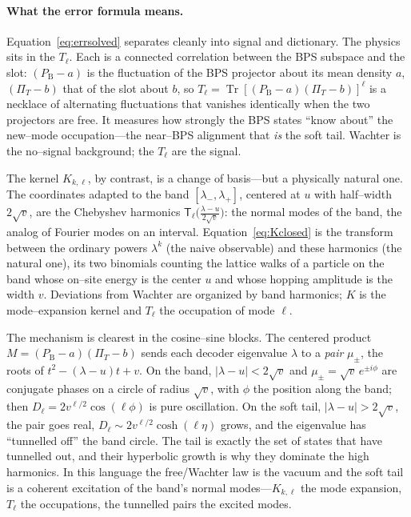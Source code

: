 \documentclass[11pt]{article}
\newcommand{\Tr}{\operatorname{Tr}}
\newcommand{\PB}{P_{\mathrm B}}
\newcommand{\PiT}{\Pi_T}
\begin{document}
\paragraph{What the error formula means.} Equation~\eqref{eq:errsolved} separates cleanly into signal
and dictionary. The physics sits in the $T_\ell$. Each is a connected correlation between the BPS
subspace and the slot: $(\PB-a)$ is the fluctuation of the BPS projector about its mean density $a$,
$(\PiT-b)$ that of the slot about $b$, so $T_\ell=\Tr[(\PB-a)(\PiT-b)]^\ell$ is a necklace of
alternating fluctuations that vanishes identically when the two projectors are free. It measures how
strongly the BPS states ``know about'' the new--mode occupation---the near--BPS alignment that
\emph{is} the soft tail. Wachter is the no--signal background; the $T_\ell$ are the signal.

The kernel $K_{k,\ell}$, by contrast, is a change of basis---but a physically natural one. The
coordinates adapted to the band $[\lambda_-,\lambda_+]$, centered at $u$ with half--width $2\sqrt v$,
are the Chebyshev harmonics $\mathsf T_\ell\!\big(\tfrac{\lambda-u}{2\sqrt v}\big)$: the normal modes of
the band, the analog of Fourier modes on an interval. Equation~\eqref{eq:Kclosed} is the transform
between the ordinary powers $\lambda^k$ (the naive observable) and these harmonics (the natural one),
its two binomials counting the lattice walks of a particle on the band whose on--site energy is the
center $u$ and whose hopping amplitude is the width $v$. Deviations from Wachter are organized by band
harmonics; $K$ is the mode--expansion kernel and $T_\ell$ the occupation of mode $\ell$.

The mechanism is clearest in the cosine--sine blocks. The centered product $M=(\PB-a)(\PiT-b)$ sends
each decoder eigenvalue $\lambda$ to a \emph{pair} $\mu_\pm$, the roots of $t^2-(\lambda-u)t+v$. On the
band, $|\lambda-u|<2\sqrt v$ and $\mu_\pm=\sqrt v\,e^{\pm i\phi}$ are conjugate phases on a circle of
radius $\sqrt v$, with $\phi$ the position along the band; then $D_\ell=2v^{\ell/2}\cos(\ell\phi)$ is
pure oscillation. On the soft tail, $|\lambda-u|>2\sqrt v$, the pair goes real, $D_\ell\sim
2v^{\ell/2}\cosh(\ell\eta)$ grows, and the eigenvalue has ``tunnelled off'' the band circle. The tail is
exactly the set of states that have tunnelled out, and their hyperbolic growth is why they dominate the
high harmonics. In this language the free/Wachter law is the vacuum and the soft tail is a coherent
excitation of the band's normal modes---$K_{k,\ell}$ the mode expansion, $T_\ell$ the occupations, the
tunnelled pairs the excited modes.
\end{document}
